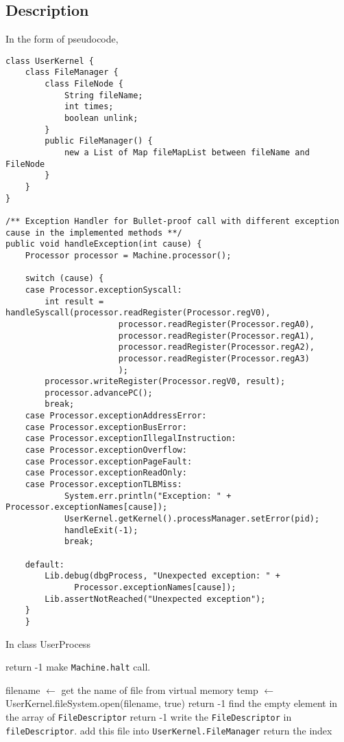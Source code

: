 \documentclass{article}
\begin{document}
\subsection{Description}
In the form of pseudocode,
\begin{lstlisting}
class UserKernel {
	class FileManager {
		class FileNode {
			String fileName;
			int times;
			boolean unlink;
		}
		public FileManager() {
			new a List of Map fileMapList between fileName and FileNode
		}
	}
}

/** Exception Handler for Bullet-proof call with different exception cause in the implemented methods **/
public void handleException(int cause) {
	Processor processor = Machine.processor();

	switch (cause) {
	case Processor.exceptionSyscall:
	    int result = handleSyscall(processor.readRegister(Processor.regV0),
				       processor.readRegister(Processor.regA0),
				       processor.readRegister(Processor.regA1),
				       processor.readRegister(Processor.regA2),
				       processor.readRegister(Processor.regA3)
				       );
	    processor.writeRegister(Processor.regV0, result);
	    processor.advancePC();
	    break;
	case Processor.exceptionAddressError:
	case Processor.exceptionBusError:
	case Processor.exceptionIllegalInstruction:
	case Processor.exceptionOverflow:
	case Processor.exceptionPageFault:
	case Processor.exceptionReadOnly:
	case Processor.exceptionTLBMiss:
			System.err.println("Exception: " + Processor.exceptionNames[cause]);
			UserKernel.getKernel().processManager.setError(pid);
			handleExit(-1);
			break;

	default:
	    Lib.debug(dbgProcess, "Unexpected exception: " +
		      Processor.exceptionNames[cause]);
	    Lib.assertNotReached("Unexpected exception");
	}
    }
\end{lstlisting}
\begin{algorithm}
		\caption{In class UserProcess}
    \begin{algorithmic}
                \State return -1
            \EndIf
						\State make \texttt{Machine.halt} call.
        \EndProcedure
    \end{algorithmic}
    \begin{algorithmic}
            \State filename $\leftarrow$ get the name of file from virtual memory
            \State temp $\leftarrow$ UserKernel.fileSystem.open(filename, true)
                \State return -1
            \Else
                \State find the empty element in the array of \texttt{FileDescriptor}
                    \State return -1
                \Else
									\State write the \texttt{FileDescriptor} in \texttt{fileDescriptor}.
									\State add this file into \texttt{UserKernel.FileManager}
                   \State return the index
                \EndIf
            \EndIf
        \EndProcedure
    \end{algorithmic}
\end{algorithm}
\end{document}
